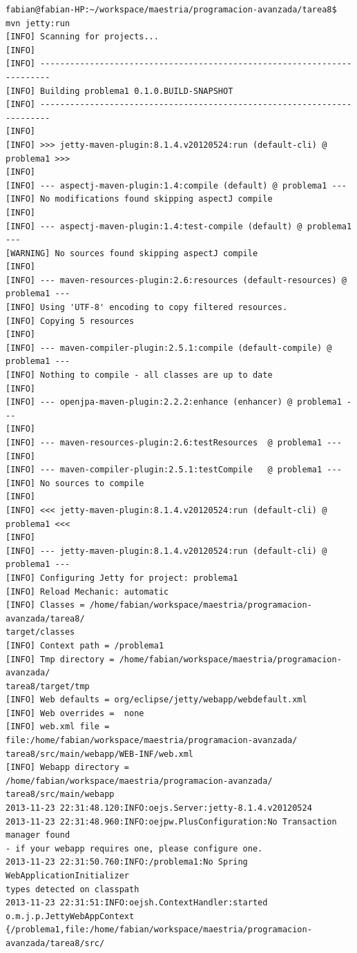 \documentclass[12pt]{article}
\begin{document}
\begin{enumerate}
\begin{lstlisting}[frame=single] 
fabian@fabian-HP:~/workspace/maestria/programacion-avanzada/tarea8$ mvn jetty:run
[INFO] Scanning for projects...
[INFO]                                                                         
[INFO] ------------------------------------------------------------------------
[INFO] Building problema1 0.1.0.BUILD-SNAPSHOT
[INFO] ------------------------------------------------------------------------
[INFO] 
[INFO] >>> jetty-maven-plugin:8.1.4.v20120524:run (default-cli) @ problema1 >>>
[INFO] 
[INFO] --- aspectj-maven-plugin:1.4:compile (default) @ problema1 ---
[INFO] No modifications found skipping aspectJ compile
[INFO] 
[INFO] --- aspectj-maven-plugin:1.4:test-compile (default) @ problema1 ---
[WARNING] No sources found skipping aspectJ compile
[INFO] 
[INFO] --- maven-resources-plugin:2.6:resources (default-resources) @ problema1 ---
[INFO] Using 'UTF-8' encoding to copy filtered resources.
[INFO] Copying 5 resources
[INFO] 
[INFO] --- maven-compiler-plugin:2.5.1:compile (default-compile) @ problema1 ---
[INFO] Nothing to compile - all classes are up to date
[INFO] 
[INFO] --- openjpa-maven-plugin:2.2.2:enhance (enhancer) @ problema1 ---
[INFO] 
[INFO] --- maven-resources-plugin:2.6:testResources  @ problema1 ---
[INFO] 
[INFO] --- maven-compiler-plugin:2.5.1:testCompile   @ problema1 ---
[INFO] No sources to compile
[INFO] 
[INFO] <<< jetty-maven-plugin:8.1.4.v20120524:run (default-cli) @ problema1 <<<
[INFO] 
[INFO] --- jetty-maven-plugin:8.1.4.v20120524:run (default-cli) @ problema1 ---
[INFO] Configuring Jetty for project: problema1
[INFO] Reload Mechanic: automatic
[INFO] Classes = /home/fabian/workspace/maestria/programacion-avanzada/tarea8/
target/classes
[INFO] Context path = /problema1
[INFO] Tmp directory = /home/fabian/workspace/maestria/programacion-avanzada/
tarea8/target/tmp
[INFO] Web defaults = org/eclipse/jetty/webapp/webdefault.xml
[INFO] Web overrides =  none
[INFO] web.xml file = file:/home/fabian/workspace/maestria/programacion-avanzada/
tarea8/src/main/webapp/WEB-INF/web.xml
[INFO] Webapp directory = /home/fabian/workspace/maestria/programacion-avanzada/
tarea8/src/main/webapp
2013-11-23 22:31:48.120:INFO:oejs.Server:jetty-8.1.4.v20120524
2013-11-23 22:31:48.960:INFO:oejpw.PlusConfiguration:No Transaction manager found 
- if your webapp requires one, please configure one.
2013-11-23 22:31:50.760:INFO:/problema1:No Spring WebApplicationInitializer 
types detected on classpath
2013-11-23 22:31:51:INFO:oejsh.ContextHandler:started o.m.j.p.JettyWebAppContext
{/problema1,file:/home/fabian/workspace/maestria/programacion-avanzada/tarea8/src/

\end{lstlisting}
\end{enumerate}
\end{document}
